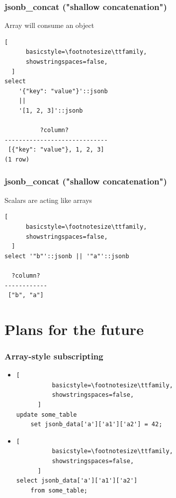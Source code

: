 \documentclass[14pt, compress]{beamer}
\begin{document}
\begin{frame}[fragile]
\frametitle{jsonb\_concat ("shallow concatenation")}
    Array will consume an object
  \begin{lstlisting}[
      basicstyle=\footnotesize\ttfamily,
      showstringspaces=false,
  ]
select 
    '{"key": "value"}'::jsonb
    ||
    '[1, 2, 3]'::jsonb 

          ?column?           
-----------------------------
 [{"key": "value"}, 1, 2, 3]
(1 row)

  \end{lstlisting}
\end{frame}

\begin{frame}[fragile]
\frametitle{jsonb\_concat ("shallow concatenation")}
    Scalars are acting like arrays
  \begin{lstlisting}[
      basicstyle=\footnotesize\ttfamily,
      showstringspaces=false,
  ]
select '"b"'::jsonb || '"a"'::jsonb

  ?column?  
------------
 ["b", "a"]

  \end{lstlisting}
\end{frame}

\section{Plans for the future}

\begin{frame}[fragile]
  \frametitle{Array-style subscripting}

  \begin{itemize}
      \item
      \begin{lstlisting}[
          basicstyle=\footnotesize\ttfamily,
          showstringspaces=false,
      ]
update some_table
    set jsonb_data['a']['a1']['a2'] = 42;

      \end{lstlisting}

      \item
      \begin{lstlisting}[
          basicstyle=\footnotesize\ttfamily,
          showstringspaces=false,
      ]
select jsonb_data['a']['a1']['a2']
    from some_table;

      \end{lstlisting}
  \end{itemize}

\end{frame}
\end{document}
